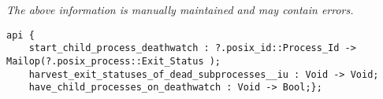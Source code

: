 \label{api:Process\_Deathwatch}

{\tiny \it The above information is manually maintained and may contain errors.}
\begin{verbatim}
api {
    start_child_process_deathwatch : ?.posix_id::Process_Id -> Mailop(?.posix_process::Exit_Status );
    harvest_exit_statuses_of_dead_subprocesses__iu : Void -> Void;
    have_child_processes_on_deathwatch : Void -> Bool;};
\end{verbatim}

